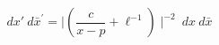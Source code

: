 \begin{equation}
dx'~d\bar{x}^{'}= \mid (\frac{c}{x-p}+\ell^{-1}) \mid^{-2}~dx~d\bar{x}
\end{equation}


